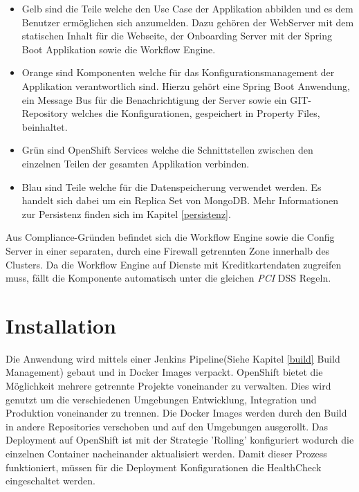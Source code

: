 \begin{itemize}
	\item Gelb sind die Teile welche den Use Case der Applikation abbilden und es dem Benutzer ermöglichen sich anzumelden. Dazu gehören der WebServer mit dem statischen Inhalt für die Webseite, der Onboarding Server mit der Spring Boot Applikation sowie die Workflow Engine.
	\item Orange sind Komponenten welche für das Konfigurationsmanagement der Applikation verantwortlich sind. Hierzu gehört eine Spring Boot Anwendung, ein Message Bus für die Benachrichtigung der Server sowie ein GIT-Repository welches die Konfigurationen, gespeichert in Property Files, beinhaltet.
	\item Grün sind OpenShift Services welche die Schnittstellen zwischen den einzelnen Teilen der gesamten Applikation verbinden.
	\item Blau sind Teile welche für die Datenspeicherung verwendet werden. Es handelt sich dabei um ein Replica Set von MongoDB. Mehr Informationen zur Persistenz finden sich im Kapitel \ref{persistenz}.
\end{itemize}
Aus Compliance-Gründen befindet sich die Workflow Engine sowie die Config Server in einer separaten, durch eine Firewall getrennten Zone innerhalb des Clusters. Da die Workflow Engine auf Dienste mit Kreditkartendaten zugreifen muss, fällt die Komponente automatisch unter die gleichen \textit{\gls{PCI}} DSS Regeln. 

\section{Installation}

Die Anwendung wird mittels einer Jenkins Pipeline(Siehe Kapitel \ref{build} Build Management) gebaut und in Docker Images verpackt. OpenShift bietet die Möglichkeit mehrere getrennte Projekte voneinander zu verwalten. Dies wird genutzt um die verschiedenen Umgebungen Entwicklung, Integration und Produktion voneinander zu trennen. Die Docker Images werden durch den Build in andere Repositories verschoben und auf den Umgebungen ausgerollt. Das Deployment auf OpenShift ist mit der Strategie 'Rolling' konfiguriert wodurch die einzelnen Container nacheinander aktualisiert werden. Damit dieser Prozess funktioniert, müssen für die Deployment Konfigurationen die HealthCheck eingeschaltet werden.

